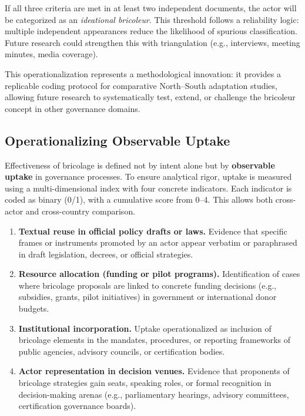 If all three criteria are met in at least two independent documents, the actor will 
be categorized as an \textit{ideational bricoleur}. This threshold follows a reliability 
logic: multiple independent appearances reduce the likelihood of spurious classification. 
Future research could strengthen this with triangulation (e.g., interviews, meeting minutes, media coverage).

\smallskip
This operationalization represents a methodological innovation: it provides a 
replicable coding protocol for comparative North–South adaptation studies, 
allowing future research to systematically test, extend, or challenge the 
bricoleur concept in other governance domains.


\subsection*{Operationalizing Observable Uptake}

Effectiveness of bricolage is defined not by intent alone but by \textbf{observable uptake} 
in governance processes. To ensure analytical rigor, uptake is measured using a 
multi-dimensional index with four concrete indicators. Each indicator is coded as binary (0/1), 
with a cumulative score from 0--4. This allows both cross-actor and cross-country comparison.

\begin{enumerate}
    \item \textbf{Textual reuse in official policy drafts or laws.}  
    Evidence that specific frames or instruments promoted by an actor appear verbatim 
    or paraphrased in draft legislation, decrees, or official strategies.

    \item \textbf{Resource allocation (funding or pilot programs).}  
    Identification of cases where bricolage proposals are linked to concrete 
    funding decisions (e.g., subsidies, grants, pilot initiatives) in government or 
    international donor budgets.

    \item \textbf{Institutional incorporation.}  
    Uptake operationalized as inclusion of bricolage elements in the mandates, 
    procedures, or reporting frameworks of public agencies, advisory councils, or 
    certification bodies.

    \item \textbf{Actor representation in decision venues.}  
    Evidence that proponents of bricolage strategies gain seats, speaking roles, 
    or formal recognition in decision-making arenas (e.g., parliamentary hearings, 
    advisory committees, certification governance boards).
\end{enumerate}

